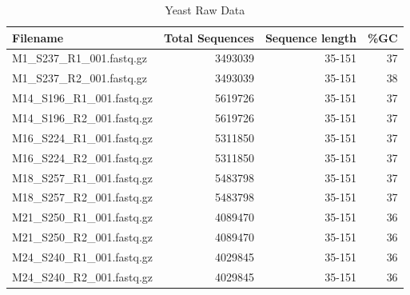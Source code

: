 \documentclass[10pt,a4paper]{article}
\begin{document}
\begin{table}[]
\centering
\begin{tabular}{l|r|r|r}
\textbf{Filename}           &\textbf{Total Sequences} & \textbf{Sequence length} & \textbf{\%GC} \\ \hline
M1\_S237\_R1\_001.fastq.gz  & 3493039                                      & 35-151                                       & 37                                \\
M1\_S237\_R2\_001.fastq.gz  & 3493039                                      & 35-151                                       & 38                                \\
M14\_S196\_R1\_001.fastq.gz & 5619726                                      & 35-151                                       & 37                                \\
M14\_S196\_R2\_001.fastq.gz & 5619726                                      & 35-151                                       & 37                                \\
M16\_S224\_R1\_001.fastq.gz & 5311850                                      & 35-151                                       & 37                                \\
M16\_S224\_R2\_001.fastq.gz & 5311850                                      & 35-151                                       & 37                                \\
M18\_S257\_R1\_001.fastq.gz & 5483798                                      & 35-151                                       & 37                                \\
M18\_S257\_R2\_001.fastq.gz & 5483798                                      & 35-151                                       & 37                                \\
M21\_S250\_R1\_001.fastq.gz & 4089470                                      & 35-151                                       & 36                                \\
M21\_S250\_R2\_001.fastq.gz & 4089470                                      & 35-151                                       & 36                                \\
M24\_S240\_R1\_001.fastq.gz & 4029845                                      & 35-151                                       & 36                                \\
M24\_S240\_R2\_001.fastq.gz & 4029845                                      & 35-151                                       & 36                               
\end{tabular}
\caption{Yeast Raw Data}
\label{tab:yeastfiles}
\end{table}
\end{document}
